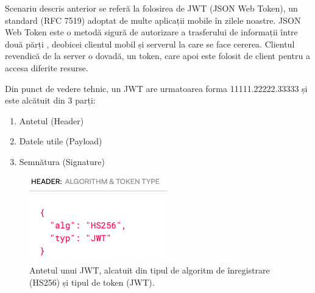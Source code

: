 \documentclass[12pt]{article}
\begin{document}
Scenariu descris anterior se referă la folosirea de JWT (JSON Web Token), un standard (RFC 7519) \cite{rfc-7519} 
adoptat de multe aplicații mobile în zilele noastre. 
JSON Web Token este o metodă sigură de autorizare a trasferului
de informații între două părți \cite{jwt}, deobicei 
clientul mobil și serverul la care se face cererea. Clientul revendică de la server
o dovadă, un token, care apoi este folosit de client pentru a accesa diferite 
resurse.

Din punct de vedere tehnic, un JWT are urmatoarea forma 11111.22222.33333 și este
alcătuit din 3 parți:

\begin{enumerate}
    \item Antetul (Header)
    \item Datele utile (Payload)
    \item Semnătura (Signature)
\end{enumerate}


\begin{figure}[H]
    \begin{minipage}[c]{0.5\textwidth}
        \includegraphics[width=\textwidth]{jwt-header.png}
    \end{minipage}\hfill
    \begin{minipage}[c]{0.5\textwidth}
        \caption{Antetul unui JWT, alcatuit din tipul de algoritm 
        de înregistrare (HS256) și tipul de token (JWT).}
    \end{minipage}
\end{figure}
\end{document}

